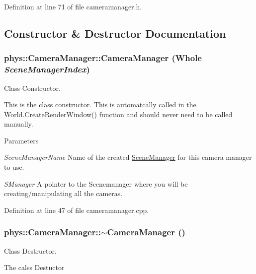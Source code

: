 Definition at line 71 of file cameramanager.h.



\subsection{Constructor \& Destructor Documentation}
\hypertarget{classphys_1_1CameraManager_ae2d0ecf1130183393bb5c1e0b2d3169d}{
\subsubsection[{CameraManager}]{\setlength{\rightskip}{0pt plus 5cm}phys::CameraManager::CameraManager ({\bf Whole} {\em SceneManagerIndex})}}
\label{d9/d91/classphys_1_1CameraManager_ae2d0ecf1130183393bb5c1e0b2d3169d}


Class Constructor. 

This is the class constructor. This is automatcally called in the World.CreateRenderWindow() function and should never need to be called manually. 
\begin{DoxyParams}{Parameters}
\item[{\em SceneManagerName}]Name of the created \hyperlink{classphys_1_1SceneManager}{SceneManager} for this camera manager to use. \item[{\em SManager}]A pointer to the Scenemanager where you will be creating/manipulating all the cameras. \end{DoxyParams}


Definition at line 47 of file cameramanager.cpp.

\hypertarget{classphys_1_1CameraManager_a0b0f032477309eb47b0302fd5eef198c}{
\subsubsection[{$\sim$CameraManager}]{\setlength{\rightskip}{0pt plus 5cm}phys::CameraManager::$\sim$CameraManager ()}}
\label{d9/d91/classphys_1_1CameraManager_a0b0f032477309eb47b0302fd5eef198c}


Class Destructor. 

The calss Destuctor 

